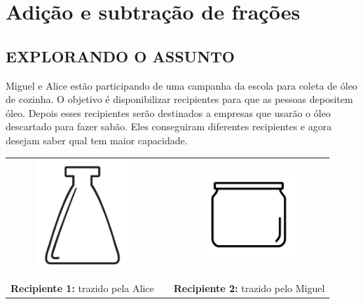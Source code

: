 
\setcounter{chapter}{4}
\chapter{Adição e subtração de frações }

\section{EXPLORANDO O ASSUNTO }

\setcounter{subsection}{0}
\begin{atividade}{}


Miguel e Alice estão participando de uma campanha da escola para coleta de óleo de cozinha. O objetivo é disponibilizar recipientes para que as pessoas depositem óleo. Depois esses recipientes serão destinados a empresas que usarão o óleo descartado para fazer sabão. Eles conseguiram diferentes recipientes e agora desejam saber qual tem maior capacidade.

\begin{center}
\begin{tabular}{ccc}
\includegraphics[width=100pt, keepaspectratio]{../figuras/licao05/ativ1_fig01.png} &\quad \quad&\includegraphics[width=100pt, keepaspectratio]{../figuras/licao05/ativ1_fig02.png}\\ \\
{\bf Recipiente 1:} trazido pela Alice & & {\bf Recipiente 2:} trazido pelo Miguel
\end{tabular}
\end{center}
\vspace{.2cm}


\end{atividade}
